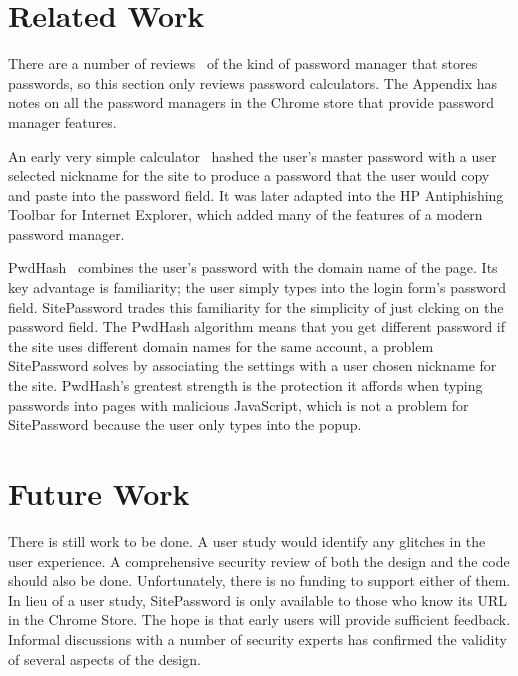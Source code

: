 \section{Related Work}\label{sec:related}

There are a number of reviews~\cite{oesch} of the kind of password manager that stores passwords, so this section only reviews password calculators.  The Appendix has notes on all the password managers in the Chrome store that provide password manager features.

An early very simple calculator~\cite{ssp} hashed the user's master password with a user selected nickname for the site to produce a password that the user would copy and paste into the password field.  It was later adapted into the HP Antiphishing Toolbar for Internet Explorer, which added many of the features of a modern password manager.

PwdHash~\cite{pwdhash} combines the user's password with the domain name of the page.  Its key advantage is familiarity; the user simply types into the login form's password field.  SitePassword trades this familiarity for the simplicity of just clcking on the password field.  The PwdHash algorithm means that you get different password if the site uses different domain names for the same account, a problem SitePassword solves by associating the settings with a user chosen nickname for the site.  PwdHash's greatest strength is the protection it affords when typing passwords into pages with malicious JavaScript, which is not a problem for SitePassword because the user only types into the popup.


\section{Future Work}\label{sec:future}

There is still work to be done.  A user study would identify any glitches in the user experience.  A comprehensive security review of both the design and the code should also be done.  Unfortunately, there is no funding to support either of them.  In lieu of a user study, SitePassword is only available to those who know its URL in the Chrome Store.  The hope is that early users will provide sufficient feedback.  Informal discussions with a number of security experts has confirmed the validity of several aspects of the design.

